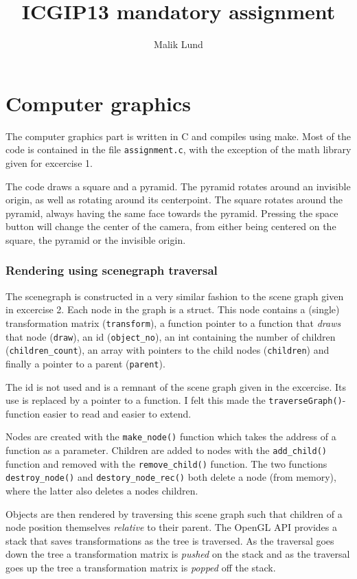 \documentclass[10pt,a4paper]{article}
\author{Malik Lund}
\title{ICGIP13 mandatory assignment}
\begin{document}
\part{Computer graphics}
The computer graphics part is written in C and compiles using make. Most of the code is contained in the file \texttt{assignment.c}, with the exception of the math library given for excercise 1. 

The code draws a square and a pyramid. The pyramid rotates around an invisible origin, as well as rotating around its centerpoint. The square rotates around the pyramid, always having the same face towards the pyramid. Pressing the space button will change the center of the camera, from either being centered on the square, the pyramid or the invisible origin.

\section{Rendering using scenegraph traversal}

The scenegraph is constructed in a very similar fashion to the scene graph given in excercise 2. Each node in the graph is a struct. This node contains a (single) transformation matrix (\texttt{transform}), a function pointer to a function that \emph{draws} that node (\texttt{draw}), an id (\texttt{object\_no}), an int containing the number of children (\texttt{children\_count}), an array with pointers to the child nodes (\texttt{children}) and finally a pointer to a parent (\texttt{parent}).

The id is not used and is a remnant of the scene graph given in the excercise. Its use is replaced by a pointer to a function. I felt this made the \texttt{traverseGraph()}-function easier to read and easier to extend.

Nodes are created with the \texttt{make\_node()} function which takes the address of a function as a parameter. Children are added to nodes with the \texttt{add\_child()} function and removed with the \texttt{remove\_child()} function. The two functions \texttt{destroy\_node()} and \texttt{destory\_node\_rec()} both delete a node (from memory), where the latter also deletes a nodes children.

Objects are then rendered by traversing this scene graph such that children of a node position themselves \emph{relative} to their parent. The OpenGL API provides a stack that saves transformations as the tree is traversed. As the traversal goes down the tree a transformation matrix is \emph{pushed} on the stack and as the traversal goes up the tree a transformation matrix is \emph{popped} off the stack.
\end{document}
